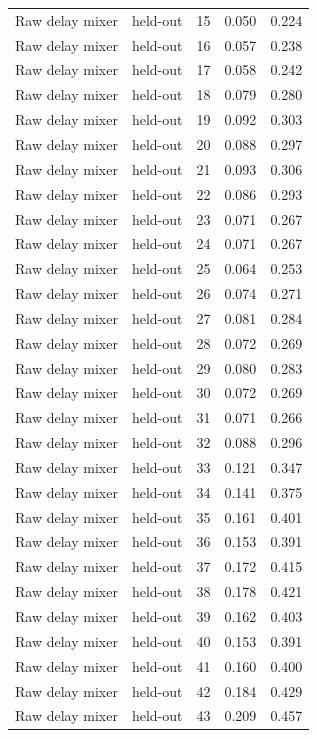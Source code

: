 \begin{tabular}{llrrr}
Raw delay mixer & held-out & 15 & 0.050 & 0.224 \\
Raw delay mixer & held-out & 16 & 0.057 & 0.238 \\
Raw delay mixer & held-out & 17 & 0.058 & 0.242 \\
Raw delay mixer & held-out & 18 & 0.079 & 0.280 \\
Raw delay mixer & held-out & 19 & 0.092 & 0.303 \\
Raw delay mixer & held-out & 20 & 0.088 & 0.297 \\
Raw delay mixer & held-out & 21 & 0.093 & 0.306 \\
Raw delay mixer & held-out & 22 & 0.086 & 0.293 \\
Raw delay mixer & held-out & 23 & 0.071 & 0.267 \\
Raw delay mixer & held-out & 24 & 0.071 & 0.267 \\
Raw delay mixer & held-out & 25 & 0.064 & 0.253 \\
Raw delay mixer & held-out & 26 & 0.074 & 0.271 \\
Raw delay mixer & held-out & 27 & 0.081 & 0.284 \\
Raw delay mixer & held-out & 28 & 0.072 & 0.269 \\
Raw delay mixer & held-out & 29 & 0.080 & 0.283 \\
Raw delay mixer & held-out & 30 & 0.072 & 0.269 \\
Raw delay mixer & held-out & 31 & 0.071 & 0.266 \\
Raw delay mixer & held-out & 32 & 0.088 & 0.296 \\
Raw delay mixer & held-out & 33 & 0.121 & 0.347 \\
Raw delay mixer & held-out & 34 & 0.141 & 0.375 \\
Raw delay mixer & held-out & 35 & 0.161 & 0.401 \\
Raw delay mixer & held-out & 36 & 0.153 & 0.391 \\
Raw delay mixer & held-out & 37 & 0.172 & 0.415 \\
Raw delay mixer & held-out & 38 & 0.178 & 0.421 \\
Raw delay mixer & held-out & 39 & 0.162 & 0.403 \\
Raw delay mixer & held-out & 40 & 0.153 & 0.391 \\
Raw delay mixer & held-out & 41 & 0.160 & 0.400 \\
Raw delay mixer & held-out & 42 & 0.184 & 0.429 \\
Raw delay mixer & held-out & 43 & 0.209 & 0.457 \\

\end{tabular}
